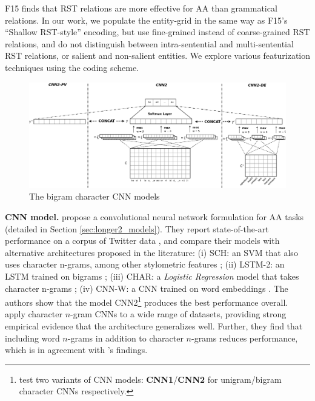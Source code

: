 %

F15 finds that RST relations are more effective for AA than grammatical relations. In our work, we populate the entity-grid in the same way as F15's ``Shallow RST-style'' encoding, but use fine-grained instead of coarse-grained RST relations, and do not distinguish between intra-sentential and multi-sentential RST relations, or salient and non-salient entities. 
We explore various featurization techniques using the coding scheme. 
\medskip

\begin{figure}
\includegraphics[width=\linewidth]{plots/longer2_cnn_diagram.png}
\vspace{-1.5em}
\caption{The bigram character CNN models}
\label{fig:cnn2}
\end{figure}

\noindent\textbf{CNN model.}
 propose a convolutional neural network formulation for AA tasks (detailed in Section \ref{sec:longer2_models}).
They report state-of-the-art performance on a corpus of Twitter data \citep{Schwartz:2013}, and compare their models with alternative architectures proposed in the literature:
(i) SCH: an SVM that also uses character n-grams, among other stylometric features \citep{Schwartz:2013};
(ii) LSTM-2: an LSTM trained on bigrams \citep{Tai:2015};
(iii) CHAR: a \emph{Logistic Regression} model that takes character n-grams \citep{Stamatatos:2009};
(iv) CNN-W: a CNN trained on word embeddings \citep{Kalchbrenner:2014}.
The authors show that the model CNN2\footnote{\citet{Shrestha:2017} test two variants of CNN models: \textbf{CNN1}/\textbf{CNN2} for unigram/bigram character CNNs respectively.} produces the best performance overall.
 apply character $n$-gram CNNs to a wide range of datasets, providing strong empirical evidence that the architecture generalizes well. 
Further, they find that including word $n$-grams in addition to character $n$-grams reduces performance, which is in agreement with \citet{Sari:2017}'s findings. 

